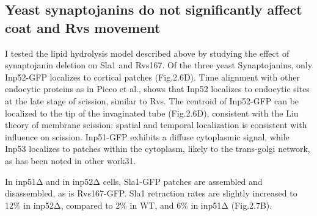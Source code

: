 	\subsection{Yeast synaptojanins do not significantly affect coat and Rvs movement } 

	

I tested the lipid hydrolysis model described above by studying the effect of synaptojanin deletion on Sla1 and Rvs167. Of the three yeast Synaptojanins, only Inp52-GFP localizes to cortical patches (Fig.2.6D). Time alignment with other endocytic proteins as in Picco et al., shows that Inp52 localizes to endocytic sites at the late stage of scission, similar to Rvs. The centroid of Inp52-GFP can be localized to the tip of the invaginated tube (Fig.2.6D), consistent with the Liu theory of membrane scission: spatial and temporal localization is consistent with influence on scission. Inp51-GFP exhibits a diffuse cytoplasmic signal, while Inp53 localizes to patches within the cytoplasm, likely to the trans-golgi network, as has been noted in other work31. 
	\vspace{5mm}
	
In inp51Δ and in inp52Δ cells, Sla1-GFP patches are assembled and disassembled, as is Rvs167-GFP. Sla1 retraction rates are slightly increased to 12\% in inp52Δ, compared to 2\% in WT, and 6\% in inp51Δ (Fig.2.7B). 
\vspace{5mm}
		
